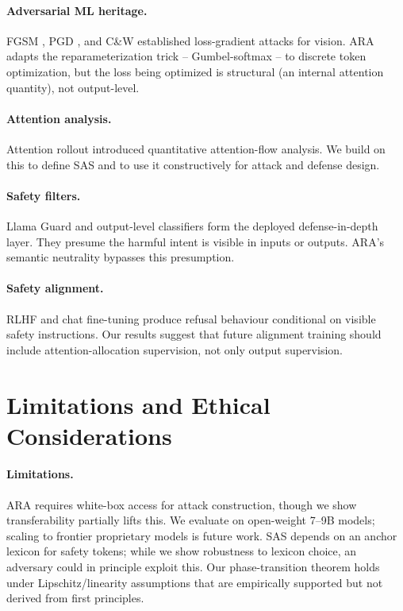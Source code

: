\documentclass{article}
\theoremstyle{definition}
\theoremstyle{remark}
\begin{document}
\paragraph{Adversarial ML heritage.} FGSM \cite{goodfellow2015fgsm}, PGD \cite{madry2018pgd}, and C\&W \cite{carlini2017towards} established loss-gradient attacks for vision. ARA adapts the reparameterization trick -- Gumbel-softmax \cite{jang2017gumbel,maddison2017concrete} -- to discrete token optimization, but the loss being optimized is structural (an internal attention quantity), not output-level.

\paragraph{Attention analysis.} Attention rollout \cite{abnar2020rollout} introduced quantitative attention-flow analysis. We build on this to define SAS and to use it constructively for attack and defense design.

\paragraph{Safety filters.} Llama Guard \cite{inan2023llamaguard} and output-level classifiers form the deployed defense-in-depth layer. They presume the harmful intent is visible in inputs or outputs. ARA's semantic neutrality bypasses this presumption.

\paragraph{Safety alignment.} RLHF \cite{ouyang2022training} and chat fine-tuning \cite{touvron2023llama2,grattafiori2024llama3,jiang2023mistral,gemmateam2024gemma2} produce refusal behaviour conditional on visible safety instructions. Our results suggest that future alignment training should include attention-allocation supervision, not only output supervision.

\section{Limitations and Ethical Considerations}
\label{sec:ethics}

\paragraph{Limitations.} ARA requires white-box access for attack construction, though we show transferability partially lifts this. We evaluate on open-weight 7--9B models; scaling to frontier proprietary models is future work. SAS depends on an anchor lexicon for safety tokens; while we show robustness to lexicon choice, an adversary could in principle exploit this. Our phase-transition theorem holds under Lipschitz/linearity assumptions that are empirically supported but not derived from first principles.
\end{document}
